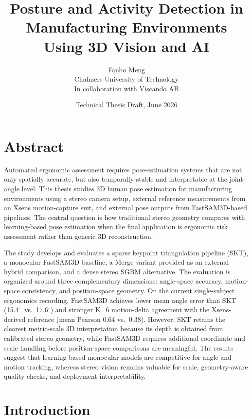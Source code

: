 \documentclass[12pt,a4paper]{article}
\title{\textbf{Posture and Activity Detection in Manufacturing Environments\\Using 3D Vision and AI}}
\author{Fanbo Meng\\
\small Chalmers University of Technology\\
\small In collaboration with Viscando AB}
\date{Technical Thesis Draft, June 2026}
\newcommand{\degr}{\ensuremath{^\circ}}
\begin{document}
\maketitle
\tableofcontents
\newpage

\section*{Abstract}

Automated ergonomic assessment requires pose-estimation systems that are not
only spatially accurate, but also temporally stable and interpretable at the
joint-angle level.
This thesis studies 3D human pose estimation for manufacturing environments
using a stereo camera setup, external reference measurements from an Xsens
motion-capture suit, and external pose outputs from FastSAM3D-based pipelines.
The central question is how traditional stereo geometry compares with
learning-based pose estimation when the final application is ergonomic risk
assessment rather than generic 3D reconstruction.

The study develops and evaluates a sparse keypoint triangulation pipeline
(SKT), a monocular FastSAM3D baseline, a Merge variant provided as an external
hybrid comparison, and a dense stereo SGBM alternative.
The evaluation is organized around three complementary dimensions:
angle-space accuracy, motion-space consistency, and position-space geometry.
On the current single-subject ergonomics recording, FastSAM3D achieves lower
mean angle error than SKT (15.4\degr\ vs.\ 17.6\degr) and stronger K=6
motion-delta agreement with the Xsens-derived reference (mean Pearson 0.64
vs.\ 0.38).
However, SKT retains the clearest metric-scale 3D interpretation because its
depth is obtained from calibrated stereo geometry, while FastSAM3D requires
additional coordinate and scale handling before position-space comparisons are
meaningful.
The results suggest that learning-based monocular models are competitive for
angle and motion tracking, whereas stereo vision remains valuable for scale,
geometry-aware quality checks, and deployment interpretability.

\newpage
\section{Introduction}
\end{document}

